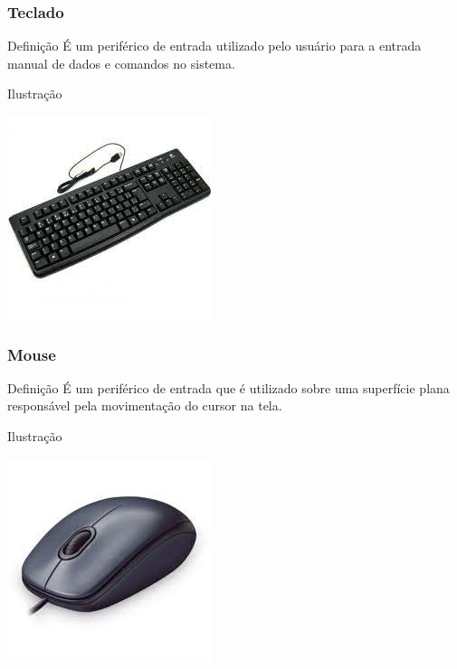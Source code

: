 \documentclass[aspectratio=169]{beamer} %
\begin{document}
\begin{frame}
	\frametitle{Teclado}
	
	\begin{block}{Defini\c cão}
		É um periférico de entrada utilizado pelo usuário para a entrada manual de dados e comandos no sistema.
	\end{block}\vfill
	
	\begin{exampleblock}{Ilustra\c cão}
		\begin{center}
			\includegraphics[scale=0.4]{img/teclado}
		\end{center}
	\end{exampleblock}
\end{frame}

\begin{frame}
	\frametitle{Mouse}
	
	\begin{block}{Defini\c cão}
		É um periférico de entrada que é utilizado sobre uma superfície plana responsável pela movimenta\c cão do cursor na tela.
	\end{block}\vfill
	
	\begin{exampleblock}{Ilustra\c cão}
		\begin{center}
			\includegraphics[scale=0.4]{img/mouse}
		\end{center}		
	\end{exampleblock}
\end{frame}
\end{document}
